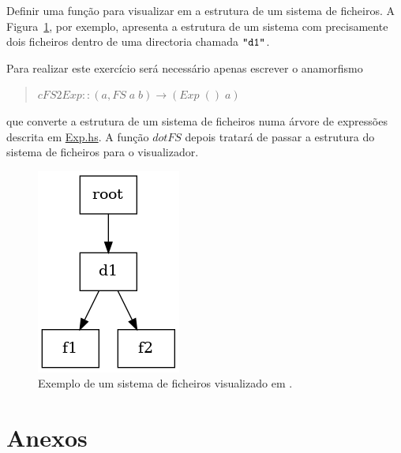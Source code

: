 \documentclass[a4paper]{article}
\newcommand{\Conid}[1]{\mathit{#1}}
\newcommand{\Varid}[1]{\mathit{#1}}
\begin{document}
Definir uma função para visualizar em 
a estrutura de um sistema de ficheiros. A Figura~\ref{ex_prob1}, por exemplo,
apresenta a estrutura de um sistema com precisamente dois ficheiros dentro
de uma directoria chamada \ensuremath{\text{\ttfamily \char34 d1\char34}}.

Para realizar este exercício será necessário apenas  escrever o anamorfismo
\begin{quote}
\ensuremath{\Varid{cFS2Exp}\mathbin{::}(\Varid{a},\Conid{FS}\;\Varid{a}\;\Varid{b})\to (\Conid{Exp}\;()\;\Varid{a})}
\end{quote}
que converte a estrutura de um sistema de ficheiros numa árvore de expressões
descrita em \href{http://wiki.di.uminho.pt/twiki/pub/Education/CP/MaterialPedagogico/Exp.hs}{Exp.hs}.
A função \ensuremath{\Varid{dotFS}} depois tratará de passar a estrutura do sistema de ficheiros para o visualizador.
\begin{figure}
\centering
\includegraphics[scale=0.5]{cp1819t_media/fs.png}
\caption{Exemplo de um sistema de ficheiros visualizado em .}
\label{ex_prob1}
\end{figure}


\newpage

\part*{Anexos}

\appendix
\end{document}
